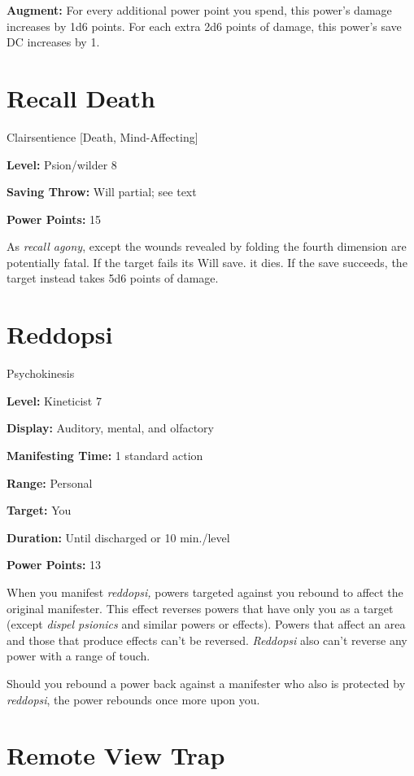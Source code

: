 \documentclass{article}
\begin{document}
\textbf{Augment:} For every additional power point you spend, this power's damage 
increases by 1d6 points. For each extra 2d6 points of damage, this power's save 
DC increases by 1.

\vspace{12pt}
\section*{Recall Death}

Clairsentience [Death, Mind-Affecting]

\textbf{Level:} Psion/wilder 8

\textbf{Saving Throw:} Will partial; see text

\textbf{Power Points:} 15

As \textit{recall agony}, except the wounds revealed by folding the fourth dimension 
are potentially fatal. If the target fails its Will save. it dies. If the save 
succeeds, the target instead takes 5d6 points of damage.

\vspace{12pt}
\section*{Reddopsi}

Psychokinesis

\textbf{Level:} Kineticist 7

\textbf{Display:} Auditory, mental, and olfactory

\textbf{Manifesting Time:} 1 standard action

\textbf{Range:} Personal

\textbf{Target:} You

\textbf{Duration:} Until discharged or 10 min./level

\textbf{Power Points:} 13

When you manifest \textit{reddopsi, }powers targeted against you rebound to affect 
the original manifester. This effect reverses powers that have only you as a target 
(except \textit{dispel psionics }and similar powers or effects). Powers that affect 
an area and those that produce effects can't be reversed. \textit{Reddopsi }also 
can't reverse any power with a range of touch.

Should you rebound a power back against a manifester who also is protected by \textit{reddopsi}, 
the power rebounds once more upon you.

\vspace{12pt}
\section*{Remote View Trap}
\end{document}
